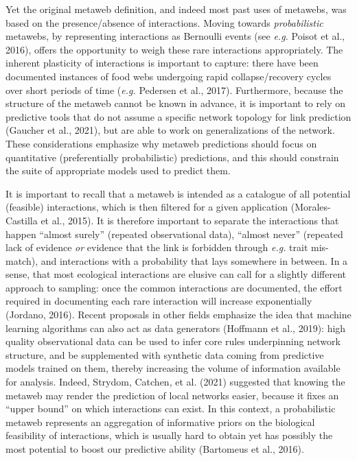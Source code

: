 \documentclass[11pt]{article}
\begin{document}
Yet the original metaweb definition, and indeed most past uses of
metawebs, was based on the presence/absence of interactions. Moving
towards \emph{probabilistic} metawebs, by representing interactions as
Bernoulli events (see \emph{e.g.} Poisot et al., 2016), offers the
opportunity to weigh these rare interactions appropriately. The inherent
plasticity of interactions is important to capture: there have been
documented instances of food webs undergoing rapid collapse/recovery
cycles over short periods of time (\emph{e.g.} Pedersen et al., 2017).
Furthermore, because the structure of the metaweb cannot be known in
advance, it is important to rely on predictive tools that do not assume
a specific network topology for link prediction (Gaucher et al., 2021),
but are able to work on generalizations of the network. These
considerations emphasize why metaweb predictions should focus on
quantitative (preferentially probabilistic) predictions, and this should
constrain the suite of appropriate models used to predict them.

It is important to recall that a metaweb is intended as a catalogue of
all potential (feasible) interactions, which is then filtered for a
given application (Morales-Castilla et al., 2015). It is therefore
important to separate the interactions that happen ``almost surely''
(repeated observational data), ``almost never'' (repeated lack of
evidence \emph{or} evidence that the link is forbidden through
\emph{e.g.} trait mis-match), and interactions with a probability that
lays somewhere in between. In a sense, that most ecological interactions
are elusive can call for a slightly different approach to sampling: once
the common interactions are documented, the effort required in
documenting each rare interaction will increase exponentially (Jordano,
2016). Recent proposals in other fields emphasize the idea that machine
learning algorithms can also act as data generators (Hoffmann et al.,
2019): high quality observational data can be used to infer core rules
underpinning network structure, and be supplemented with synthetic data
coming from predictive models trained on them, thereby increasing the
volume of information available for analysis. Indeed, Strydom, Catchen,
et al. (2021) suggested that knowing the metaweb may render the
prediction of local networks easier, because it fixes an ``upper bound''
on which interactions can exist. In this context, a probabilistic
metaweb represents an aggregation of informative priors on the
biological feasibility of interactions, which is usually hard to obtain
yet has possibly the most potential to boost our predictive ability
(Bartomeus et al., 2016).
\end{document}
